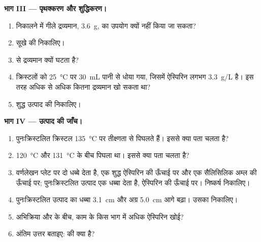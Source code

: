\begin{problem}[{सप्ताहांत समस्या --- तीन ग्राम सैलिसिलिक अम्ल से शुद्ध ऐस्पिरिन के
एक जार तक: लब्धि क्या है?}]
\medskip
\noindent\textbf{भाग III --- पृथक्करण और शुद्धिकरण।}
\begin{enumerate}[resume]
  \item {} निकालने में गीले द्रव्यमान, \qty{3.6}{g}, का उपयोग क्यों नहीं किया
        जा सकता?
  \item सूखे  की  निकालिए।
  \item {} से द्रव्यमान क्यों घटता है?
  \item क्रिस्टलों को \qty{25}{\celsius} पर \qty{30}{mL} पानी से धोया गया, जिसमें
        ऐस्पिरिन लगभग \qty{3.3}{g/L}  है। इस तरह अधिक से अधिक कितना
        द्रव्यमान खो सकता था?
  \item शुद्ध उत्पाद की  निकालिए।
\end{enumerate}

\medskip
\noindent\textbf{भाग IV --- उत्पाद की जाँच।}
\begin{enumerate}[resume]
  \item पुनःक्रिस्टलित क्रिस्टल \qty{135}{\celsius} पर तीक्ष्णता से पिघलते हैं।
        इससे क्या पता चलता है?
  \item {} \qty{120}{\celsius} और
        \qty{131}{\celsius} के बीच पिघला था। इससे क्या पता चलता है?
  \item वर्णलेखन प्लेट पर  दो धब्बे देता है,
        एक शुद्ध ऐस्पिरिन की ऊँचाई पर और एक सैलिसिलिक अम्ल की ऊँचाई पर;
        पुनःक्रिस्टलित उत्पाद एक धब्बा देता है, ऐस्पिरिन की
        ऊँचाई पर। निष्कर्ष निकालिए।
  \item पुनःक्रिस्टलित उत्पाद का धब्बा \qty{3.1}{cm} और  अग्र
        \qty{5.0}{cm} आगे बढ़ा। उसका  निकालिए।
  \item अभिक्रिया और  के बीच, काम के किस भाग में अधिक
        ऐस्पिरिन खोई?
  \item अंतिम उत्तर बताइए:  की  क्या है?
\end{enumerate}
\end{problem}
